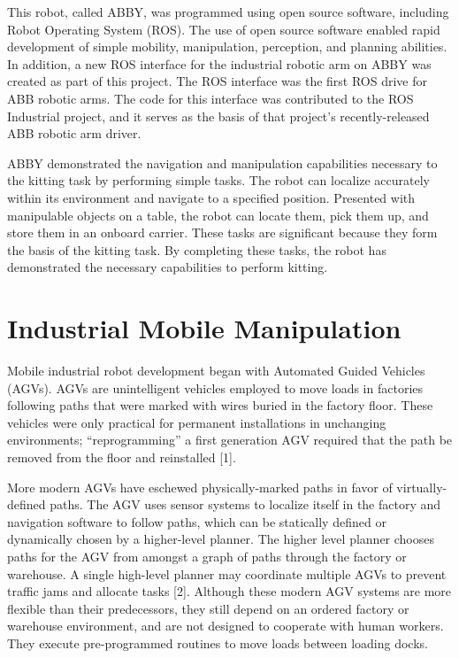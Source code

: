 \documentclass[]{cwru} %
\begin{document}
This robot, called ABBY, was programmed using open source software,
including Robot Operating System (ROS). The use of open source software
enabled rapid development of simple mobility, manipulation, perception,
and planning abilities. In addition, a new ROS interface for the
industrial robotic arm on ABBY was created as part of this project. The
ROS interface was the first ROS drive for ABB robotic arms. The code for
this interface was contributed to the ROS Industrial project, and it
serves as the basis of that project's recently-released ABB robotic arm
driver.

ABBY demonstrated the navigation and manipulation capabilities necessary
to the kitting task by performing simple tasks. The robot can localize
accurately within its environment and navigate to a specified position.
Presented with manipulable objects on a table, the robot can locate
them, pick them up, and store them in an onboard carrier. These tasks
are significant because they form the basis of the kitting task. By
completing these tasks, the robot has demonstrated the necessary
capabilities to perform kitting.

\chapter{Industrial Mobile Manipulation}

Mobile industrial robot development began with Automated Guided Vehicles
(AGVs). AGVs are unintelligent vehicles employed to move loads in
factories following paths that were marked with wires buried in the
factory floor. These vehicles were only practical for permanent
installations in unchanging environments; ``reprogramming'' a first
generation AGV required that the path be removed from the floor and
reinstalled {[}1{]}.

More modern AGVs have eschewed physically-marked paths in favor of
virtually-defined paths. The AGV uses sensor systems to localize itself
in the factory and navigation software to follow paths, which can be
statically defined or dynamically chosen by a higher-level planner. The
higher level planner chooses paths for the AGV from amongst a graph of
paths through the factory or warehouse. A single high-level planner may
coordinate multiple AGVs to prevent traffic jams and allocate tasks
{[}2{]}. Although these modern AGV systems are more flexible than their
predecessors, they still depend on an ordered factory or warehouse
environment, and are not designed to cooperate with human workers. They
execute pre-programmed routines to move loads between loading docks.
\end{document}
